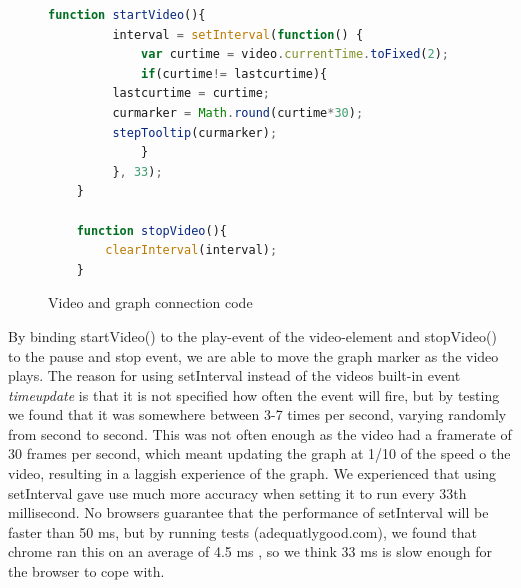 \begin{figure}
	\begin{lstlisting}[language=javascript]
	function startVideo(){
	     interval = setInterval(function() {
	         var curtime = video.currentTime.toFixed(2);
	         if(curtime!= lastcurtime){
		 lastcurtime = curtime;
		 curmarker = Math.round(curtime*30);
		 stepTooltip(curmarker);
	         }
	     }, 33);
	}

	function stopVideo(){
		clearInterval(interval);
	}
	\end{lstlisting}
	\caption{Video and graph connection code}
	\label{fig:videocode}
\end{figure}

By binding startVideo() to the play-event of the video-element and stopVideo() to the pause and stop event, we are able to move the graph marker as the video plays. The reason for using setInterval instead of the videos built-in event \emph{timeupdate} is that it is not specified how often the event will fire, but by testing we found that it was somewhere between 3-7 times per second, varying randomly from second to second. This was not often enough as the video had a framerate of 30 frames per second, which meant updating the graph at 1/10 of the speed o the video, resulting in a laggish experience of the graph. We experienced that using setInterval gave use much more accuracy when setting it to run every 33th millisecond. No browsers guarantee that the performance of setInterval will be faster than 50 ms, but by running tests (adequatlygood.com), we found that chrome ran this on an average of 4.5 ms , so we think 33 ms is slow enough for the browser to cope with.
